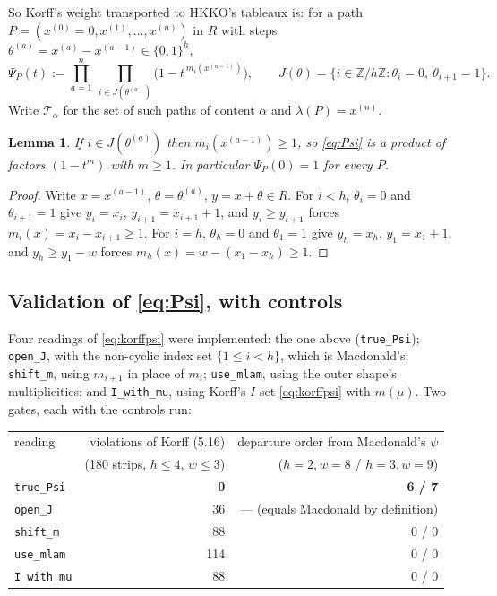 \documentclass[11pt]{article}
\newtheorem{lemma}[theorem]{Lemma}
\theoremstyle{definition}
\newcommand{\la}{\lambda}
\newcommand{\Z}{\mathbb{Z}}
\newcommand{\T}{\mathcal{T}}
\begin{document}
So Korff's weight transported to HKKO's tableaux is: for a path
$P=(x^{(0)}=0,x^{(1)},\dots,x^{(n)})$ in $R$ with steps
$\theta^{(a)}=x^{(a)}-x^{(a-1)}\in\{0,1\}^{h}$,
\begin{equation}\label{eq:Psi}
 \Psi_P(t):=\prod_{a=1}^{n}\ \prod_{i\in J(\theta^{(a)})}
     \bigl(1-t^{\,m_i(x^{(a-1)})}\bigr),
 \qquad J(\theta)=\{i\in\Z/h\Z:\theta_i=0,\ \theta_{i+1}=1\}.
\end{equation}
Write $\T_\alpha$ for the set of such paths of content $\alpha$ and
$\la(P)=x^{(n)}$.

\begin{lemma}\label{lem:wd}
If $i\in J(\theta^{(a)})$ then $m_i(x^{(a-1)})\ge1$, so \eqref{eq:Psi} is a
product of factors $(1-t^{m})$ with $m\ge1$. In particular
$\Psi_P(0)=1$ for every $P$.
\end{lemma}

\begin{proof}
Write $x=x^{(a-1)}$, $\theta=\theta^{(a)}$, $y=x+\theta\in R$. For $i<h$,
$\theta_i=0$ and $\theta_{i+1}=1$ give $y_i=x_i$, $y_{i+1}=x_{i+1}+1$, and
$y_i\ge y_{i+1}$ forces $m_i(x)=x_i-x_{i+1}\ge1$. For $i=h$, $\theta_h=0$ and
$\theta_1=1$ give $y_h=x_h$, $y_1=x_1+1$, and $y_h\ge y_1-w$ forces
$m_h(x)=w-(x_1-x_h)\ge1$.
\end{proof}

\subsection*{Validation of \eqref{eq:Psi}, with controls}

Four readings of \eqref{eq:korffpsi} were implemented: the one above
(\texttt{true\_Psi}); \texttt{open\_J}, with the non-cyclic index set
$\{1\le i<h\}$, which is Macdonald's; \texttt{shift\_m}, using $m_{i+1}$ in
place of $m_i$; \texttt{use\_mlam}, using the outer shape's multiplicities;
and \texttt{I\_with\_mu}, using Korff's $I$-set \eqref{eq:korffpsi} with
$m(\mu)$. Two gates, each with the controls run:

\begin{center}
\begin{tabular}{lrr}
\hline
reading & violations of Korff (5.16) & departure order from Macdonald's $\psi$ \\
 & (180 strips, $h\le4$, $w\le3$) & ($h=2,w=8$ / $h=3,w=9$) \\
\hline
\texttt{true\_Psi} & \textbf{0} & \textbf{6 / 7} \\
\texttt{open\_J}   & 36 & --- (equals Macdonald by definition) \\
\texttt{shift\_m}  & 88 & 0 / 0 \\
\texttt{use\_mlam} & 114 & 0 / 0 \\
\texttt{I\_with\_mu} & 88 & 0 / 0 \\
\hline
\end{tabular}
\end{center}
\end{document}
